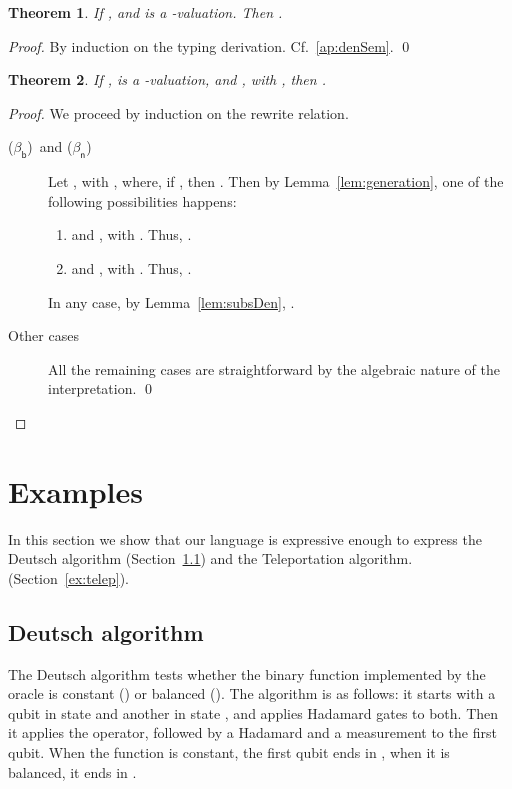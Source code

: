 \documentclass[preprint]{elsarticle}
\newtheorem{theorem}{Theorem}[section]
\newcommand\s[1]{\ensuremath{\mathsf{#1}}}
\newcommand\rbetab{(\s{\beta_b})}
\newcommand\rbetan{(\s{\beta_n})}
\begin{document}
\begin{theorem}\label{thm:soundness}
  If , and  is a -valuation. Then .
\end{theorem}
\begin{proof}
  By induction on the typing derivation. Cf.~\ref{ap:denSem}. \qed
\end{proof}

\begin{theorem}\label{thm:denRed}
  If ,  is a -valuation, and ,
  with , then .
\end{theorem}
\begin{proof}
  We proceed by induction on the rewrite relation.
  \begin{description}
  \item[\rbetab\ and \rbetan] Let , with , where, if , then . Then by
    Lemma~\ref{lem:generation}, one of the following possibilities happens:
    \begin{enumerate}
    \item  and , with
      . Thus, .
    \item  and ,
      with . Thus, .
    \end{enumerate}
    In any case, by Lemma~\ref{lem:subsDen}, .
  \item[Other cases] All the remaining cases are straightforward by the
    algebraic nature of the interpretation.
    \qed
  \end{description}
\end{proof}

\section{Examples}\label{sec:examples}
In this section we show that our language is expressive enough to express the
Deutsch algorithm (Section~\ref{ex:deut}) and the Teleportation algorithm.
(Section~\ref{ex:telep}).

\subsection{Deutsch algorithm}\label{ex:deut}
The Deutsch algorithm tests whether the binary function  implemented by the
oracle  is constant () or balanced (). The
algorithm is as follows: it starts with a qubit in state  and another in
state , and applies Hadamard gates to both. Then it applies the 
operator, followed by a Hadamard and a measurement to the first qubit. When the
function is constant, the first qubit ends in , when it is balanced, it
ends in .
\end{document}
